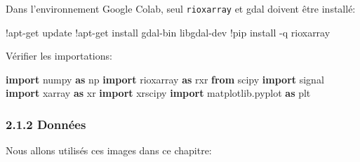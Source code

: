 \documentclass[
]{article}
\newenvironment{Shaded}{}{}
\newcommand{\BuiltInTok}[1]{\textcolor[rgb]{0.00,0.50,0.00}{#1}}
\newcommand{\ImportTok}[1]{\textcolor[rgb]{0.00,0.50,0.00}{\textbf{#1}}}
\newcommand{\NormalTok}[1]{#1}
\newcommand{\OperatorTok}[1]{\textcolor[rgb]{0.40,0.40,0.40}{#1}}
\begin{document}
Dans l'environnement Google Colab, seul \texttt{rioxarray} et gdal
doivent être installé:

\label{16ee207c}
\label{cb1}
\begin{Shaded}
\begin{Highlighting}[]
\OperatorTok{!}\NormalTok{apt}\OperatorTok{{-}}\NormalTok{get update}
\OperatorTok{!}\NormalTok{apt}\OperatorTok{{-}}\NormalTok{get install gdal}\OperatorTok{{-}}\BuiltInTok{bin}\NormalTok{ libgdal}\OperatorTok{{-}}\NormalTok{dev}
\OperatorTok{!}\NormalTok{pip install }\OperatorTok{{-}}\NormalTok{q rioxarray}
\end{Highlighting}
\end{Shaded}

Vérifier les importations:

\label{2e63a7f1}
\label{cb2}
\begin{Shaded}
\begin{Highlighting}[]
\ImportTok{import}\NormalTok{ numpy }\ImportTok{as}\NormalTok{ np}
\ImportTok{import}\NormalTok{ rioxarray }\ImportTok{as}\NormalTok{ rxr}
\ImportTok{from}\NormalTok{ scipy }\ImportTok{import}\NormalTok{ signal}
\ImportTok{import}\NormalTok{ xarray }\ImportTok{as}\NormalTok{ xr}
\ImportTok{import}\NormalTok{ xrscipy}
\ImportTok{import}\NormalTok{ matplotlib.pyplot }\ImportTok{as}\NormalTok{ plt}
\end{Highlighting}
\end{Shaded}

\subsubsection{\texorpdfstring{{2.1.2}
Données}{2.1.2 Données}}\label{donnuxe9es}

Nous allons utilisés ces images dans ce chapitre:
\end{document}
